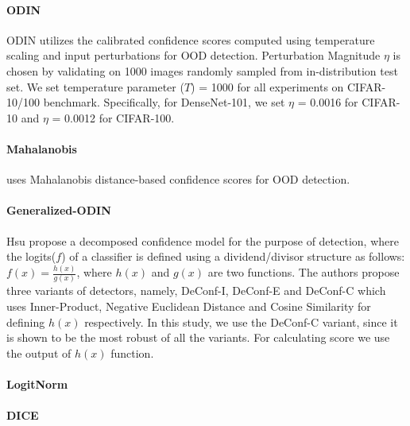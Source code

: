 \paragraph{ODIN \cite{liang2018enhancing}} ODIN utilizes the calibrated confidence scores computed using temperature scaling and input perturbations for OOD detection. Perturbation Magnitude $\eta$ is chosen by validating on 1000 images randomly sampled from in-distribution test set. We set temperature parameter ($T$) = 1000 for all experiments on CIFAR-10/100 benchmark. Specifically, for DenseNet-101, we set $\eta$ = 0.0016 for CIFAR-10 and $\eta$ = 0.0012 for CIFAR-100.

\paragraph{Mahalanobis \cite{lee2018simple}} uses Mahalanobis distance-based confidence scores for OOD detection. 


\paragraph{Generalized-ODIN \cite{hsu2020generalized}} Hsu \etal propose a decomposed confidence model for the purpose of \ood detection, where the logits($f$) of a classifier is  defined using a dividend/divisor structure as follows: $	f(x) =\frac{h(x)}{g(x)}$, where $h(x)$ and $g(x)$ are two functions. The authors propose three variants of \ood detectors, namely, DeConf-I, DeConf-E and DeConf-C which uses Inner-Product, Negative Euclidean Distance and Cosine Similarity for defining $h(x)$ respectively. In this study, we use the DeConf-C variant, since it is shown to be the most robust of all the variants. For calculating \ood score we use the output of $h(x)$ function.

\paragraph{LogitNorm~\cite{wei2022mitigating}}
\paragraph{DICE~\cite{sun2022dice}}

